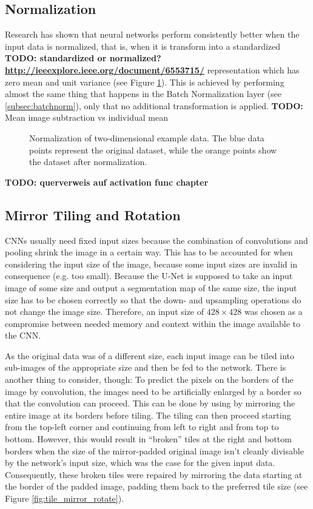 		\subsection{Normalization}
Research \cite{lecun_norm} has shown that neural networks perform consistently better when the input data is normalized, that is, when it is transform into a standardized \textbf{TODO: standardized or normalized? \url{http://ieeexplore.ieee.org/document/6553715/}} representation which has zero mean and unit variance (see Figure \ref{fig:norma}). This is achieved by performing almost the same thing that happens in the Batch Normalization layer (see \ref{subsec:batchnorm}), only that no additional transformation is applied. \textbf{TODO:} Mean image subtraction vs individual mean

\begin {figure}[!ht]
	\begin{center}
		
	\end{center}
	\caption[]{Normalization of two-dimensional example data. The blue data points represent the original dataset, while the orange points show the dataset after normalization.}
	\label{fig:norma}
\end {figure}

\textbf{TODO: querverweis auf activation func chapter}


		\subsection{Mirror Tiling and Rotation}
\label{subsec:mirror_tiling}
CNNs usually need fixed input sizes because the combination of convolutions and pooling shrink the image in a certain way. This has to be accounted for when considering the input size of the image, because some input sizes are invalid in consequence (e.g. too small). Because the U-Net is supposed to take an input image of some size and output a segmentation map of the same size, the input size has to be chosen correctly so that the down- and upsampling operations do not change the image size. Therefore, an input size of $428 \times 428$ was chosen as a compromise between needed memory and context within the image available to the CNN.

As the original data was of a different size, each input image can be tiled into sub-images of the appropriate size and then be fed to the network. There is another thing to consider, though: To predict the pixels on the borders of the image by convolution, the images need to be artificially enlarged by a border so that the convolution can proceed. This can be done by using by mirroring the entire image at its borders before tiling. The tiling can then proceed starting from the top-left corner and continuing from left to right and from top to bottom. However, this would result in ``broken'' tiles at the right and bottom borders when the size of the mirror-padded original image isn't cleanly divisable by the network's input size, which was the case for the given input data. Consequently, these broken tiles were repaired by mirroring the data starting at the border of the padded image, padding them back to the preferred tile size (see Figure \ref{fig:tile_mirror_rotate}).\\

